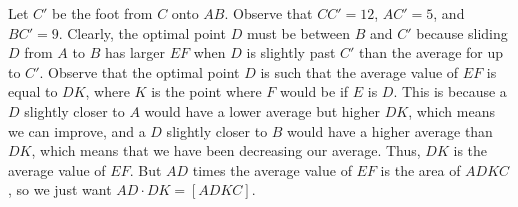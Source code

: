 Let $C'$ be the foot from $C$ onto $AB$. Observe that $CC'=12$, $AC'=5$, and $BC'=9$. Clearly, the optimal point $D$ must be between $B$ and $C'$ because sliding $D$ from $A$ to $B$ has larger $EF$ when $D$ is slightly past $C'$ than the average for up to $C'$. Observe that the optimal point $D$ is such that the average value of $EF$ is equal to $DK$, where $K$ is the point where $F$ would be if $E$ is $D$. This is because a $D$ slightly closer to $A$ would have a lower average but higher $DK$, which means we can improve, and a $D$ slightly closer to $B$ would have a higher average than $DK$, which means that we have been decreasing our average. Thus, $DK$ is the average value of $EF$. But $AD$ times the average value of $EF$ is the area of $ADKC$, so we just want $AD\cdot DK=\left[ADKC\right]$.